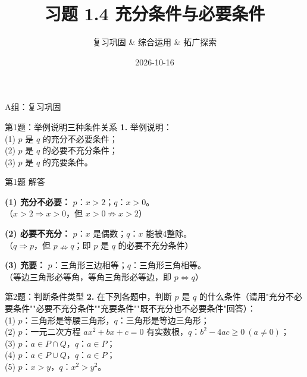 \documentclass[10pt,aspectratio=169,serif]{beamer}
\title[习题1.4]{习题 1.4 充分条件与必要条件}
\subtitle{复习巩固 \& 综合运用 \& 拓广探索}
\author{}
\institute{}
\date{2026-10-16}
\begin{document}
\begin{frame}
  \titlepage
\end{frame}

\begin{frame}[t]{A组：复习巩固}
\end{frame}

\begin{frame}[t]{第1题：举例说明三种条件关系}
\textbf{1.} 举例说明：\\
(1) $p$ 是 $q$ 的充分不必要条件；\\
(2) $p$ 是 $q$ 的必要不充分条件；\\
(3) $p$ 是 $q$ 的充要条件。
\end{frame}

\begin{frame}[t]{第1题 解答}
\begin{tcolorbox}[colback=orange!10,colframe=orange,title=\textbf{参考答案}]
\textbf{(1) 充分不必要：} $p$：$x>2$；$q$：$x>0$。\\
（$x>2\Rightarrow x>0$，但 $x>0\nRightarrow x>2$）

\vspace{0.5em}
\textbf{(2) 必要不充分：} $p$：$x$ 是偶数；$q$：$x$ 能被4整除。\\
（$q\Rightarrow p$，但 $p\nRightarrow q$；即 $p$ 是 $q$ 的必要不充分条件）

\vspace{0.5em}
\textbf{(3) 充要：} $p$：三角形三边相等；$q$：三角形三角相等。\\
（等边三角形必等角，等角三角形必等边，即 $p\Leftrightarrow q$）
\end{tcolorbox}
\end{frame}

\begin{frame}[t]{第2题：判断条件类型}
\textbf{2.} 在下列各题中，判断 $p$ 是 $q$ 的什么条件（请用"充分不必要条件""必要不充分条件""充要条件""既不充分也不必要条件"回答）：\\
(1) $p$：三角形是等腰三角形，$q$：三角形是等边三角形；\\
(2) $p$：一元二次方程 $ax^2+bx+c=0$ 有实数根，$q$：$b^2-4ac\ge 0\ (a\neq 0)$；\\
(3) $p$：$a\in P\cap Q$，$q$：$a\in P$；\\
(4) $p$：$a\in P\cup Q$，$q$：$a\in P$；\\
(5) $p$：$x>y$，$q$：$x^2>y^2$。
\end{frame}
\end{document}
